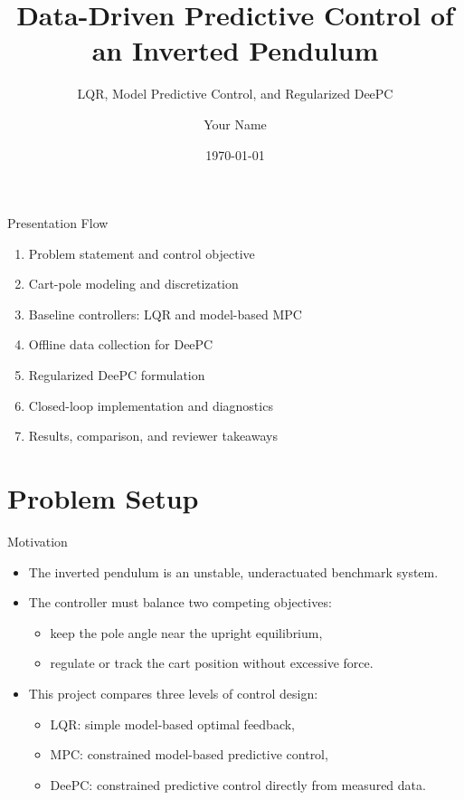 \documentclass[aspectratio=169,11pt]{beamer}
\title[Inverted Pendulum Control]{Data-Driven Predictive Control of an Inverted Pendulum}
\subtitle{LQR, Model Predictive Control, and Regularized DeePC}
\author{Your Name}
\institute{UTD \\ Model Predictive Control Project}
\date{\today}
\begin{document}
\begin{frame}
    \titlepage
\end{frame}

\begin{frame}{Presentation Flow}
    \begin{enumerate}
        \item Problem statement and control objective
        \item Cart-pole modeling and discretization
        \item Baseline controllers: LQR and model-based MPC
        \item Offline data collection for DeePC
        \item Regularized DeePC formulation
        \item Closed-loop implementation and diagnostics
        \item Results, comparison, and reviewer takeaways
    \end{enumerate}
\end{frame}

\section{Problem Setup}

\begin{frame}{Motivation}
    \begin{itemize}
        \item The inverted pendulum is an unstable, underactuated benchmark system.
        \item The controller must balance two competing objectives:
        \begin{itemize}
            \item keep the pole angle near the upright equilibrium,
            \item regulate or track the cart position without excessive force.
        \end{itemize}
        \item This project compares three levels of control design:
        \begin{itemize}
            \item LQR: simple model-based optimal feedback,
            \item MPC: constrained model-based predictive control,
            \item DeePC: constrained predictive control directly from measured data.
        \end{itemize}
    \end{itemize}
\end{frame}
\end{document}
